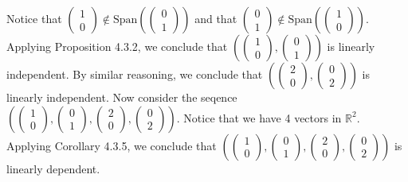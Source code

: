 \documentclass[12pt]{article}
\newenvironment{problem}[2][Problem]
{
	\begin{trivlist} 
		\item[\hskip \labelsep {\bfseries #1 #2:}]
	}
{
	\end{trivlist}
	}
\newenvironment{solution}[1][Solution]
{
	\begin{trivlist} 
		\item[\hskip \labelsep {\itshape #1:}]
	}
	{
	\end{trivlist}
}
\begin{document}
\begin{problem}{3}
\begin{solution}
Notice that $\begin{pmatrix}1\\0\end{pmatrix} \notin \text{Span}\left( \begin{pmatrix} 0\\1 \end{pmatrix} \right)$ and that $\begin{pmatrix}0\\1\end{pmatrix} \notin \text{Span}\left(\begin{pmatrix} 1\\0 \end{pmatrix} \right)$. Applying Proposition 4.3.2, we conclude that $\left( \begin{pmatrix}1\\0\end{pmatrix}, \begin{pmatrix} 0\\1 \end{pmatrix} \right)$ is linearly independent. By similar reasoning, we conclude that $\left( \begin{pmatrix}2\\0\end{pmatrix}, \begin{pmatrix} 0\\2 \end{pmatrix} \right)$ is linearly independent. Now consider the seqence $\left( \begin{pmatrix}1\\0\end{pmatrix}, \begin{pmatrix} 0\\1 \end{pmatrix}, \begin{pmatrix}2\\0\end{pmatrix}, \begin{pmatrix} 0\\2 \end{pmatrix} \right)$. Notice that we have 4 vectors in $\mathbb{R}^2$. Applying Corollary 4.3.5, we conclude that $\left( \begin{pmatrix}1\\0\end{pmatrix}, \begin{pmatrix} 0\\1 \end{pmatrix}, \begin{pmatrix}2\\0\end{pmatrix}, \begin{pmatrix} 0\\2 \end{pmatrix} \right)$ is linearly dependent.

\end{solution}
\end{problem}
\end{document}
